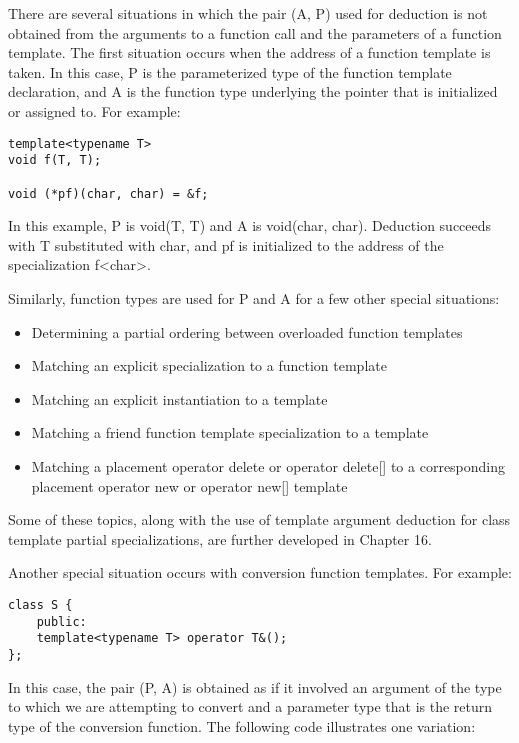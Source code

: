There are several situations in which the pair (A, P) used for deduction is not obtained from the arguments to a function call and the parameters of a function template. The first situation occurs when the address of a function template is taken. In this case, P is the parameterized type of the function template declaration, and A is the function type underlying the pointer that is initialized or assigned to. For example:

\begin{lstlisting}[style=styleCXX]
template<typename T>
void f(T, T);

void (*pf)(char, char) = &f;
\end{lstlisting}

In this example, P is void(T, T) and A is void(char, char). Deduction succeeds with T substituted with char, and pf is initialized to the address of the specialization f<char>.

Similarly, function types are used for P and A for a few other special situations:

\begin{itemize}
\item 
Determining a partial ordering between overloaded function templates

\item 
 Matching an explicit specialization to a function template

\item 
Matching an explicit instantiation to a template

\item 
Matching a friend function template specialization to a template

\item 
Matching a placement operator delete or operator delete[] to a corresponding placement operator new or operator new[] template
\end{itemize}

Some of these topics, along with the use of template argument deduction for class template partial specializations, are further developed in Chapter 16.

Another special situation occurs with conversion function templates. For example:

\begin{lstlisting}[style=styleCXX]
class S {
	public:
	template<typename T> operator T&();
};
\end{lstlisting}

In this case, the pair (P, A) is obtained as if it involved an argument of the type to which we are attempting to convert and a parameter type that is the return type of the conversion function. The following code illustrates one variation:

